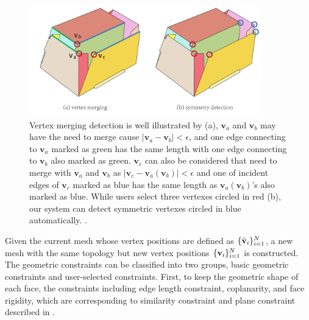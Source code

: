 
{}

\begin{figure}
	\centering
	\includegraphics[width=0.9\textwidth]{images/suggestion}
	\caption{Vertex merging detection is well illustrated by (a), $\mathbf{v}_a$ and $\mathbf{v}_b$ may have the need to merge cause $|\mathbf{v}_a-\mathbf{v}_b|<\epsilon$, and one edge connecting to $\mathbf{v}_a$ marked as green has the same length with one edge connecting to $\mathbf{v}_b$ also marked as green. $\mathbf{v}_c$ can also be considered that need to merge with $\mathbf{v}_a$ and $\mathbf{v}_b$ as $|\mathbf{v}_c-\mathbf{v}_a(\mathbf{v}_b)|<\epsilon$ and one of incident edges of $\mathbf{v}_c$ marked as blue has the same length as $\mathbf{v}_a(\mathbf{v}_b)$'s also marked as blue. While users select three vertexes circled in red (b), our system can detect symmetric vertexes circled in blue automatically. .}
	\label{fig:suggestion}
\end{figure}

Given the current mesh whose vertex positions are defined as $\{\hat{\mathbf{v}}_i\}^{N}_{i=1}$, a new mesh with the same topology but new vertex positions $\{\mathbf{v}_i\}^{N}_{i=1}$ is constructed.
%
The geometric constraints can be classified into two groups, basic geometric constraints and user-selected constraints. 
First, to keep the geometric shape of each face, the constraints including edge length constraint, coplanarity, and face rigidity, which are corresponding to similarity constraint and plane constraint described in \cite{Bouaziz:2012:SSD:2346796.2346802}. 

